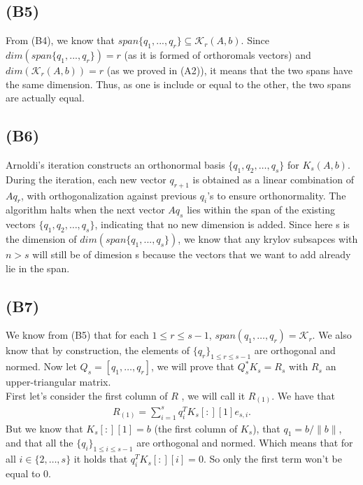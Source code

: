 \documentclass{article}
\begin{document}
\subsection*{(B5)}
From (B4), we know that $span\{q_1, ... , q_r\} \subseteq \mathcal{K}_r(A,b)$.
Since $dim(span\{q_1, ... , q_r\}) = r$ (as it is formed of orthoromals vectors)
and $dim(\mathcal{K}_r(A,b)) = r$ (as we proved in (A2)), it means that the two spans have the same dimension. 
Thus, as one is include or equal to the other, the two spans are actually equal. 

\subsection*{(B6)}


Arnoldi's iteration constructs an orthonormal basis $ \{ q_1, q_2, \dots, q_s \} $ 
for $ K_s(A, b) $. 
During the iteration, each new vector $ q_{r+1} $ is obtained as a linear combination of $ A q_r $, 
with orthogonalization against previous $ q_i $'s to ensure orthonormality. The algorithm halts when the next vector $ A q_s $ lies within the span of the existing vectors $ \{ q_1, q_2, \dots, q_s \} $, indicating that no new dimension is added.
Since here s is the dimension of $dim(span\{q_1, ... , q_s\})$, we know that any krylov subsapces with $n>s$ will still
be of dimesion s because the vectors that we want to add already lie in the span. 

\subsection*{(B7)}

We know from (B5) that for each $1 \leq r \leq s-1$, $span(q_1, \dots, q_r) = \mathcal{K}_r$. We also know that by construction, the elements of $\{ q_r \}_{1 \leq r \leq s-1}$ are orthogonal and normed. Now let $Q_s=[q_1, \dots, q_r]$, we will prove that $Q^*_sK_s=R_s$ with $R_s$ an upper-triangular matrix.\\
First let's consider the first column of $R$ , we will call it $R_{(1)}$. We have that 
\begin{align*}
    R_{(1)} = \sum_{i=1}^{s} q_i^TK_s[:][1]e_{s,i}.
\end{align*}
But we know that $K_s[:][1]=b$ (the first column of $K_s$), that $q_1=b/\|b\|$, and that all the $\{ q_i \}_{1 \leq i \leq s-1}$ are orthogonal and normed. Which means that for all $i \in \{2, \dots, s \}$ it holds that $q_i^TK_s[:][i]=0$. So only the first term won't be equal to $0$.\\
\end{document}

